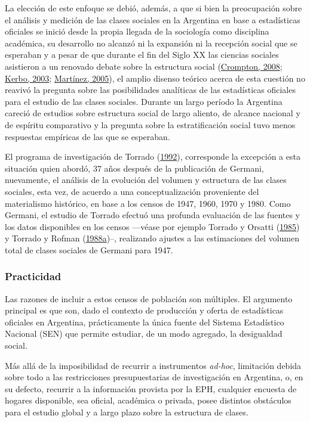 \documentclass[
]{article}
\begin{document}
La elección de este enfoque se debió, además, a que si bien la preocupación sobre el análisis y medición de las clases sociales en la Argentina en base a estadísticas oficiales se inició desde la propia llegada de la sociología como disciplina académica, su desarrollo no alcanzó ni la expansión ni la recepción social que se esperaban y a pesar de que durante el fin del Siglo XX las ciencias sociales asistieron a un renovado debate sobre la estructura social (\protect\hyperlink{ref-Crompton2008}{Crompton, 2008}; \protect\hyperlink{ref-Kerbo2003}{Kerbo, 2003}; \protect\hyperlink{ref-Martinez2005}{Martínez, 2005}), el amplio disenso teórico acerca de esta cuestión no reavivó la pregunta sobre las posibilidades analíticas de las estadísticas oficiales para el estudio de las clases sociales. Durante un largo período la Argentina careció de estudios sobre estructura social de largo aliento, de alcance nacional y de espíritu comparativo y la pregunta sobre la estratificación social tuvo menos respuestas empíricas de las que se esperaban.

El programa de investigación de Torrado (\protect\hyperlink{ref-Torrado1992}{1992}), corresponde la excepción a esta situación quien abordó, 37 años después de la publicación de Germani, nuevamente, el análisis de la evolución del volumen y estructura de las clases sociales, esta vez, de acuerdo a una conceptualización proveniente del materialismo histórico, en base a los censos de 1947, 1960, 1970 y 1980. Como Germani, el estudio de Torrado efectuó una profunda evaluación de las fuentes y los datos disponibles en los censos ---véase por ejemplo Torrado y Orsatti (\protect\hyperlink{ref-Torrado1985}{1985}) y Torrado y Rofman (\protect\hyperlink{ref-Torrado1988}{1988a})--, realizando ajustes a las estimaciones del volumen total de clases sociales de Germani para 1947.

\hypertarget{practicidad}{%
\subsubsection{Practicidad}\label{practicidad}}

Las razones de incluir a estos censos de población son múltiples. El argumento principal es que son, dado el contexto de producción y oferta de estadísticas oficiales en Argentina, prácticamente la única fuente del Sistema Estadístico Nacional (SEN) que permite estudiar, de un modo agregado, la desigualdad social.

Más allá de la imposibilidad de recurrir a instrumentos \emph{ad-hoc}, limitación debida sobre todo a las restricciones presupuestarias de investigación en Argentina, o, en su defecto, recurrir a la información provista por la EPH, cualquier encuesta de hogares disponible, sea oficial, académica o privada, posee distintos obstáculos para el estudio global y a largo plazo sobre la estructura de clases.
\end{document}
